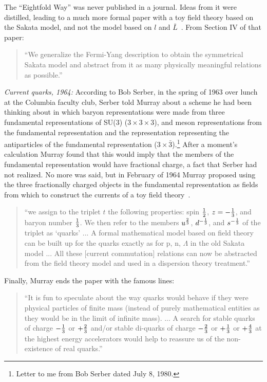 \documentclass[12pt]{article}
\begin{document}
The ``Eightfold Way'' was never published in a journal. Ideas from it were distilled, leading to a much more formal paper with a toy field theory based on the Sakata model, and not the model based on $l$ and $\bar L$~\cite{MGMsymmetries}. From Section IV of that paper:
\begin{quote}
``We generalize the Fermi-Yang description to obtain the symmetrical Sakata model and abstract from it as many physically meaningful relations as possible.''
\end{quote}

{\it Current quarks, 1964:} 
According to Bob Serber, in the spring of 1963 over lunch at the Columbia faculty club, Serber told Murray about a scheme he had been thinking about in which baryon representations were made from three fundamental representations of SU(3) ($3\times3\times3$), and meson representations from the fundamental representation and the representation representing the antiparticles of the fundamental representation ($3\times\bar3$).\footnote{Letter to me from Bob Serber dated July 8, 1980.} After a moment's calculation Murray found that this would imply that the members of the fundamental representation would have fractional charge, a fact that Serber had not realized. No more was said, but in February of 1964 Murray proposed using the three fractionally charged objects in the fundamental representation as fields from which to construct the currents of a toy field theory~\cite{MGMschematic}.
\begin{quote}
``we assign to the triplet $t$ the following properties: spin $1\over2$, $z = -{1\over 3}$, and baryon number $1\over 3$.  We then refer to the members $u^{2\over3}$, $d^{-{1\over3}}$, and $s^{-{1\over3}}$ of the triplet as `quarks' ...
\noindent
A formal mathematical model based on field theory can be built up for the quarks exactly as for p, n, $\Lambda$ in the old Sakata model ...
\noindent
All these [current commutation] relations can now be abstracted from the field theory model and used in a dispersion theory treatment.''
\end{quote}
Finally, Murray ends the paper with the famous lines:
\begin{quote}
``It is fun to speculate about the way quarks would behave if they were physical particles of finite mass (instead of purely mathematical entities as they would be in the limit of infinite mass). ...
A search for stable quarks of charge  $-{1\over3}$ or  $+{2\over3}$ and/or stable di-quarks of charge $-{2\over3}$ or
$+{1\over3}$ or $+{4\over3}$ at the highest energy accelerators would help to reassure us of the non-existence of real quarks.''
\end{quote}
\end{document}
